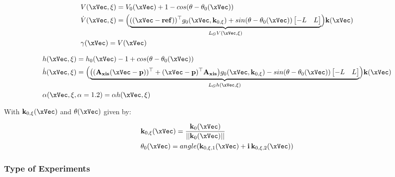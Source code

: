 \begin{subequations}
   \begin{align}
    &V(\xVec, \xi) = V_0(\xVec) + 1 - cos(\theta - \theta_0(\xVec)) \label{eq:V_unicycle} \\
    &\dot{V}(\xVec, \xi) = \Bigl(\underbrace{((\xVec-\mathbf{ref}))^{\top}g_0(\xVec, \mathbf{k}_{0,\xi}) + sin(\theta -\theta_0(\xVec))\begin{bmatrix} -L & L \end{bmatrix}}_{L_GV(\xVec, \xi)} \Bigr) \mathbf{k}(\xVec)  \label{eq:dot_V_unicycle} \\
    &\gamma(\xVec)  = V(\xVec) \label{eq:CLF_gamma_unicycle}
\end{align}
\label{eq:CLF_unicycle}
\end{subequations}

\begin{subequations}
   \begin{align}
    &h(\xVec, \xi) = h_0(\xVec) - 1 + cos(\theta - \theta_0(\xVec)) \label{eq:h_unicycle} \\
    &\dot{h}(\xVec, \xi) = \Bigl(\underbrace{\bigl((\mathbf{A_{xis}}(\xVec-\mathbf{p}))^{\top} + (\xVec-\mathbf{p})^{\top}\mathbf{A_{xis}}\bigr)g_0(\xVec, \mathbf{k}_{0,\xi}) - sin(\theta -\theta_0(\xVec))\begin{bmatrix} -L & L \end{bmatrix}}_{L_Gh(\xVec, \xi)} \Bigr) \mathbf{k}(\xVec)  \label{eq:dot_h_unicycle} \\
    &\alpha(\xVec, \xi, \alpha = 1.2)  = \alpha h(\xVec, \xi) \label{eq:CBF_alpha_unicycle}
\end{align}
\label{eq:CBF_unicycle}
\end{subequations}


With \(\mathbf{k}_{0,\xi}(\xVec)\) and \(\theta(\xVec)\) given by:

\begin{align}
    &\mathbf{k}_{0,\xi}(\xVec) = \frac{\mathbf{k}_0(\xVec) }{|| \mathbf{k}_0(\xVec) ||}      \\
    &\theta_0(\xVec) = angle(\mathbf{k}_{0,\xi,1}(\xVec) + \mathbf{i} \hspace{0.2em} \mathbf{k}_{0,\xi,2}(\xVec))
\end{align}


\subsubsection{Type of Experiments}
\label{subsubsec:unicyle_type_of_experiments}

